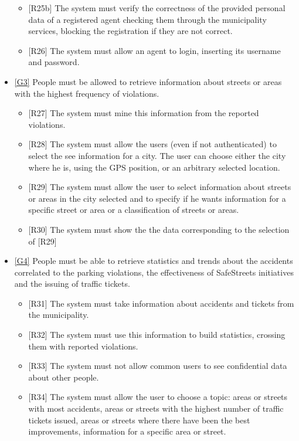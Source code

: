 \documentclass[a4paper]{report}
\begin{document}
\begin{itemize}
\begin{itemize}
\item {[R25b]} \label{R25b}The system must verify the correctness of the provided personal data of a registered agent checking them through the municipality services, blocking the registration if they are not correct.
\item {[R26]}	\label{R26}The system must allow an agent to login, inserting its username and password.
\end{itemize}
\item  \hyperref[G3]{[G3]} People must be allowed to retrieve information about streets or areas with the highest frequency of violations.
\begin{itemize}
\item {[R27]}	\label{R27}The system must mine this information from the reported violations.
\item {[R28]}	\label{R28}The system must allow the users (even if not authenticated) to select the see information for a city. The user can choose either the city where he is, using the GPS position, or an arbitrary selected location.
\item {[R29]}	\label{R29}The system must allow the user to select information about streets or areas in the city selected and to specify if he wants information for a specific street or area or a classification of streets or areas.
\item {[R30]}	\label{R30}The system must show the the data corresponding to the selection of [R29]
\end{itemize}
\item  \hyperref[G4]{[G4]} People must be able to retrieve statistics and trends about the accidents correlated to the parking violations, the effectiveness of SafeStreets initiatives and the issuing of traffic tickets.
\begin{itemize}
\item {[R31]}	\label{R31}The system must take information about accidents and tickets from the municipality.
\item {[R32]}	\label{R32}The system must use this information to build statistics, crossing them with reported violations.
\item {[R33]}	\label{R33}The system must not allow common users to see confidential data about other people.
\item {[R34]}	\label{R34}The system must allow the user to choose a topic: areas or streets with most accidents, areas or streets with the highest number of traffic tickets issued, areas or streets where there have been the best improvements, information for a specific area or street.

\end{itemize}
\end{itemize}
\end{document}
